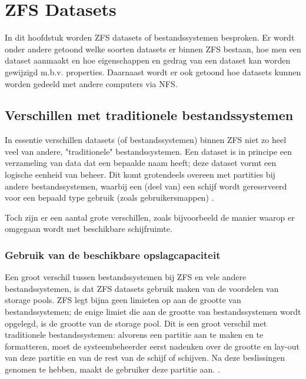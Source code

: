 

\chapter{ZFS Datasets}
\label{ch:h7}

In dit hoofdstuk worden ZFS datasets of bestandssystemen besproken. Er wordt onder andere getoond welke soorten datasets er binnen ZFS bestaan, hoe men een dataset aanmaakt en hoe eigenschappen en gedrag van een dataset kan worden gewijzigd m.b.v. properties. Daarnaast wordt er ook getoond hoe datasets kunnen worden gedeeld met andere computers via NFS. 

\section{Verschillen met traditionele bestandssystemen}

In essentie verschillen datasets (of bestandssystemen) binnen ZFS niet zo heel veel van andere, "traditionele" bestandssystemen. Een dataset is in principe een verzameling van data dat een bepaalde naam heeft; deze dataset vormt een logische eenheid van beheer. Dit komt grotendeels overeen met partities bij andere bestandssystemen, waarbij een (deel van) een schijf wordt gereserveerd voor een bepaald type gebruik (zoals gebruikersmappen) \autocite{Lucas2015}.

Toch zijn er een aantal grote verschillen, zoals bijvoorbeeld de manier waarop er omgegaan wordt met beschikbare schijfruimte.  

\subsection{Gebruik van de beschikbare opslagcapaciteit}

Een groot verschil tussen bestandssystemen bij ZFS en vele andere bestandssystemen, is dat ZFS datasets gebruik maken van de voordelen van storage pools. ZFS legt bijna geen limieten op aan de grootte van bestandssystemen; de enige limiet die aan de grootte van bestandssystemen wordt opgelegd, is de grootte van de storage pool. Dit is een groot verschil met traditionele bestandssystemen: alvorens een partitie aan te maken en te formatteren, moet de systeembeheerder eerst nadenken over de grootte en lay-out van deze partitie en van de rest van de schijf of schijven. Na deze beslissingen genomen te hebben, maakt de gebruiker deze partitie aan. \autocite{Lucas2015}.

